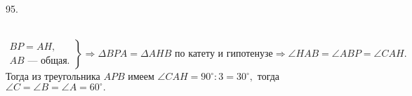 95. \begin{figure}[ht!]
\end{figure}\\
$\left.\begin{array}{l}BP=AH,\\
AB\text{ --- общая.} \end{array}\right\}\Rightarrow \Delta BPA=\Delta AHB\text{ по катету и гипотенузе}\Rightarrow \angle HAB=\angle ABP=\angle CAH.$ Тогда из треугольника $APB$ имеем $\angle CAH=90^\circ:3=30^\circ,$ тогда $\angle C=\angle B=\angle A=60^\circ.$\\
